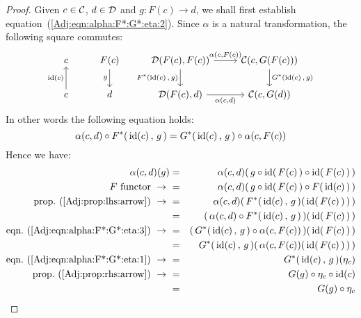 \noindent
\begin{proof}
    Given $c\in\mbox{$\cal C$}$, $d\in\mbox{$\cal D$}$ and $g:F(c)\to d$, we shall first establish 
    equation~(\ref{Adj:eqn:alpha:F*:G*:eta:2}). Since $\alpha$
    is a natural transformation, the following square commutes:
        \[
            \begin{tikzcd}
                c
                &F(c)\arrow[d,swap, "g"]
                &\Dat(F(c),F(c))\arrow[r, "\alpha\mbox{$(c,F(c))$}"]
                \arrow[d, swap,"F^{*}\mbox{$({\rm id}(c)\,,\,g)$}"]
                &\Cat(c,G(F(c)))
                \arrow[d, "G^{*}\mbox{$({\rm id}(c)\,,\,g)$}"]
                \\
                c\arrow[u, "{\rm id}(c)"]
                &d
                &\Dat(F(c),d)\arrow[r, swap, "\alpha\mbox{$(c,d)$}"]
                &\Cat(c,G(d))
            \end{tikzcd}
        \]
    In other words the following equation holds: 
        \begin{equation}\label{Adj:eqn:alpha:F*:G*:eta:3}
            \alpha(c,d)\circ F^{*}(\,\mbox{\rm id}(c)\,,\,g\,) = 
            G^{*}(\,\mbox{\rm id}(c)\,,\,g\,)\circ\alpha(c,F(c))
        \end{equation}
    Hence we have:
        \begin{eqnarray*}\alpha(c,d)(g)
            &=&\alpha(c,d)(\,g\circ\id(\,F(c)\,)\circ\id(\,F(c)\,)\,)\\
            \mbox{$F$ functor}\ \to\ 
            &=&\alpha(c,d)(\,g\circ\id(\,F(c)\,)\circ F(\,\id(c)\,)\,)\\
            \mbox{prop.~(\ref{Adj:prop:lhs:arrow})}\ \to\ 
            &=&\alpha(c,d)(\,F^{*}(\,\id(c)\,,\,g\,)(\,\id(\,F(c)\,)\,)\,)\\
            &=&(\,\alpha(c,d)\circ F^{*}(\,\id(c)\,,\,g\,)\,)(\,\id(\,F(c)\,)\,)\\
            \mbox{eqn.~(\ref{Adj:eqn:alpha:F*:G*:eta:3})}\ \to\ 
            &=&(\,G^{*}(\,\id(c)\,,\,g\,)\circ\alpha(c,F(c))\,)(\,\id(\,F(c)\,)\,)\\
            &=&G^{*}(\,\id(c)\,,\,g\,)(\,\alpha(c,F(c))(\,\id(\,F(c)\,)\,)\,)\\
            \mbox{eqn.~(\ref{Adj:eqn:alpha:F*:G*:eta:1})}\ \to\ 
            &=&G^{*}(\,\id(c)\,,\,g\,)(\eta_{c})\\
            \mbox{prop.~(\ref{Adj:prop:rhs:arrow})}\ \to\ 
            &=&G(g)\circ\eta_{c}\circ\id(c)\\
            &=&G(g)\circ\eta_{c}\\

\end{eqnarray*}
\end{proof}
